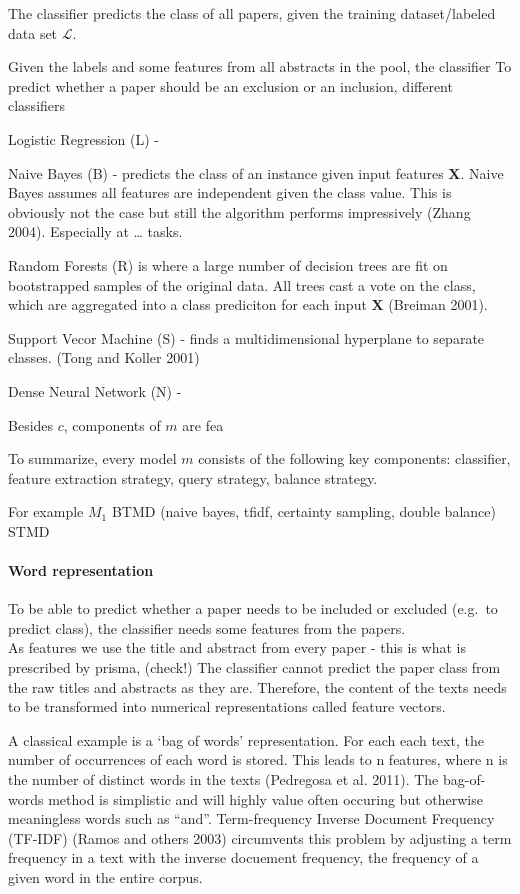 \documentclass[
]{article}
\begin{document}
The classifier predicts the class of all papers, given the training
dataset/labeled data set \(\mathcal{L}\).

Given the labels and some features from all abstracts in the pool, the
classifier To predict whether a paper should be an exclusion or an
inclusion, different classifiers

Logistic Regression (L) -

Naive Bayes (B) - predicts the class of an instance given input features
\(\mathbf{X}\). Naive Bayes assumes all features are independent given
the class value. This is obviously not the case but still the algorithm
performs impressively (Zhang 2004). Especially at \ldots{} tasks.

Random Forests (R) is where a large number of decision trees are fit on
bootstrapped samples of the original data. All trees cast a vote on the
class, which are aggregated into a class prediciton for each input
\(\mathbf{X}\) (Breiman 2001).

Support Vecor Machine (S) - finds a multidimensional hyperplane to
separate classes. (Tong and Koller 2001)

Dense Neural Network (N) -

Besides \(c\), components of \(m\) are fea

To summarize, every model \(m\) consists of the following key
components: classifier, feature extraction strategy, query strategy,
balance strategy.

For example \(M_1\) BTMD (naive bayes, tfidf, certainty sampling, double
balance) STMD

\hypertarget{word-representation}{%
\paragraph{Word representation}\label{word-representation}}

To be able to predict whether a paper needs to be included or excluded
(e.g.~to predict class), the classifier needs some features from the
papers.\\
As features we use the title and abstract from every paper - this is
what is prescribed by prisma, (check!) The classifier cannot predict the
paper class from the raw titles and abstracts as they are. Therefore,
the content of the texts needs to be transformed into numerical
representations called feature vectors.

A classical example is a `bag of words' representation. For each each
text, the number of occurrences of each word is stored. This leads to n
features, where n is the number of distinct words in the texts
(Pedregosa et al. 2011). The bag-of-words method is simplistic and will
highly value often occuring but otherwise meaningless words such as
``and''. Term-frequency Inverse Document Frequency (TF-IDF) (Ramos and
others 2003) circumvents this problem by adjusting a term frequency in a
text with the inverse docuement frequency, the frequency of a given word
in the entire corpus.
\end{document}
